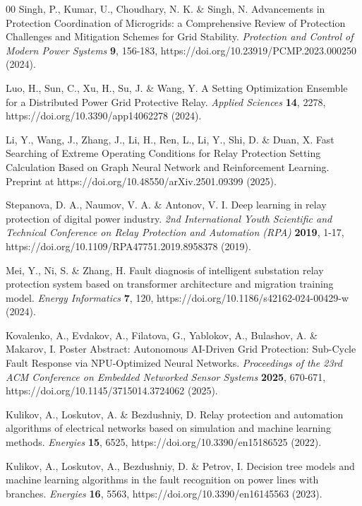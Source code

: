 \documentclass{article}
\begin{document}
\begin{thebibliography}{00}
 Singh, P., Kumar, U., Choudhary, N. K. \& Singh, N. Advancements in Protection Coordination of Microgrids: a Comprehensive Review of Protection Challenges and Mitigation Schemes for Grid Stability. \emph{Protection and Control of Modern Power Systems} \textbf{9}, 156-183, https://doi.org/10.23919/PCMP.2023.000250 (2024).

 Luo, H., Sun, C., Xu, H., Su, J. \& Wang, Y. A Setting Optimization Ensemble for a Distributed Power Grid Protective Relay. \emph{Applied Sciences} \textbf{14}, 2278, https://doi.org/10.3390/app14062278 (2024).

 Li, Y., Wang, J., Zhang, J., Li, H., Ren, L., Li, Y., Shi, D. \& Duan, X. Fast Searching of Extreme Operating Conditions for Relay Protection Setting Calculation Based on Graph Neural Network and Reinforcement Learning. Preprint at https://doi.org/10.48550/arXiv.2501.09399 (2025).

 Stepanova, D. A., Naumov, V. A. \& Antonov, V. I. Deep learning in relay protection of digital power industry. \emph{2nd International Youth Scientific and Technical Conference on Relay Protection and Automation (RPA)} \textbf{2019}, 1-17, https://doi.org/10.1109/RPA47751.2019.8958378 (2019).

 Mei, Y., Ni, S. \& Zhang, H. Fault diagnosis of intelligent substation relay protection system based on transformer architecture and migration training model. \emph{Energy Informatics} \textbf{7}, 120, https://doi.org/10.1186/s42162-024-00429-w (2024).

 Kovalenko, A., Evdakov, A., Filatova, G., Yablokov, A., Bulashov, A. \& Makarov, I. Poster Abstract: Autonomous AI-Driven Grid Protection: Sub-Cycle Fault Response via NPU-Optimized Neural Networks. \emph{Proceedings of the 23rd ACM Conference on Embedded Networked Sensor Systems} \textbf{2025}, 670-671, https://doi.org/10.1145/3715014.3724062 (2025).

 Kulikov, A., Loskutov, A. \& Bezdushniy, D. Relay protection and automation algorithms of electrical networks based on simulation and machine learning methods. \emph{Energies} \textbf{15}, 6525, https://doi.org/10.3390/en15186525 (2022).

 Kulikov, A., Loskutov, A., Bezdushniy, D. \& Petrov, I. Decision tree models and machine learning algorithms in the fault recognition on power lines with branches. \emph{Energies} \textbf{16}, 5563, https://doi.org/10.3390/en16145563 (2023).


\end{thebibliography}
\end{document}
